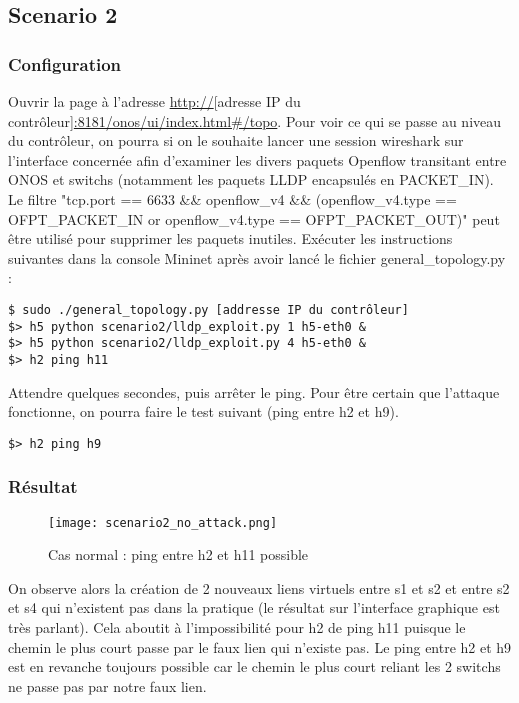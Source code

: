 \subsection{Scenario 2}

\subsubsection{Configuration}

Ouvrir la page à l'adresse \url{http://}[adresse IP du contrôleur]\url{:8181/onos/ui/index.html#/topo}.
Pour voir ce qui se passe au niveau du contrôleur, on pourra si on le souhaite lancer une session wireshark sur l'interface concernée afin d'examiner les divers paquets Openflow transitant entre ONOS et switchs (notamment les paquets LLDP encapsulés en PACKET\_IN). Le filtre "tcp.port == 6633 \&\& openflow\_v4 \&\& (openflow\_v4.type == OFPT\_PACKET\_IN or openflow\_v4.type == OFPT\_PACKET\_OUT)" peut être utilisé pour supprimer les paquets inutiles.
Exécuter les instructions suivantes dans la console Mininet après avoir lancé le fichier general\_topology.py :

\begin{verbatim}
$ sudo ./general_topology.py [addresse IP du contrôleur]
$> h5 python scenario2/lldp_exploit.py 1 h5-eth0 &
$> h5 python scenario2/lldp_exploit.py 4 h5-eth0 &
$> h2 ping h11
\end{verbatim}

Attendre quelques secondes, puis arrêter le ping. Pour être certain que l'attaque fonctionne, on pourra faire le test suivant (ping entre h2 et h9).

\begin{verbatim}
$> h2 ping h9
\end{verbatim}


\subsubsection{Résultat}

\begin{figure}[h]
  	\centering
  	\texttt{[image: scenario2\_no\_attack.png]}
  	\caption{Cas normal : ping entre h2 et h11 possible}
\end{figure}


On observe alors la création de 2 nouveaux liens virtuels entre s1 et s2 et entre s2 et s4 qui n'existent pas dans la pratique (le résultat sur l'interface graphique est très parlant). Cela aboutit à l'impossibilité pour h2 de ping h11 puisque le chemin le plus court passe par le faux lien qui n'existe pas. Le ping entre h2 et h9 est en revanche toujours possible car le chemin le plus court reliant les 2 switchs ne passe pas par notre faux lien.\\

